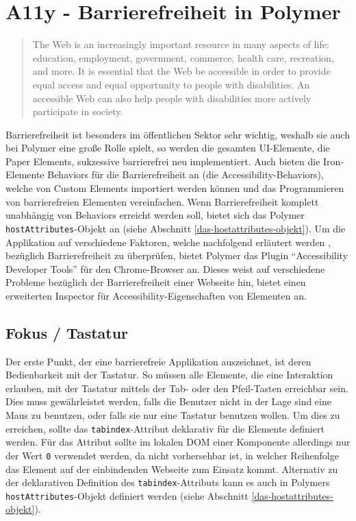 \section{A11y - Barrierefreiheit in Polymer}\label{a11y---barrierefreiheit-in-polymer}

\begin{quote}
The Web is an increasingly important resource in many aspects of life: education, employment, government, commerce, health care, recreation, and more. It is essential that the Web be accessible in order to provide equal access and equal opportunity to people with disabilities. An accessible Web can also help people with disabilities more actively participate in society. \cite{citeulike:13915280}
\end{quote}

Barrierefreiheit ist besonders im öffentlichen Sektor sehr wichtig, weshalb sie auch bei Polymer eine große Rolle spielt, so werden die gesamten \ac{UI}-Elemente, die Paper Elements, sukzessive barrierefrei neu implementiert. Auch bieten die Iron-Elemente Behaviors für die Barrierefreiheit an (die Accessibility-Behaviors), welche von Custom Elements importiert werden können und das Programmieren von barrierefreien Elementen vereinfachen. Wenn Barrierefreiheit komplett unabhängig von Behaviors erreicht werden soll, bietet sich das Polymer \texttt{hostAttributes}-Objekt an (siehe Abschnitt \ref{das-hostattributes-objekt}). Um die Applikation auf verschiedene Faktoren, welche nachfolgend erläutert werden \cite{citeulike:13915273}, bezüglich Barrierefreiheit zu überprüfen, bietet Polymer das Plugin ``Accessibility Developer Tools'' für den Chrome-Browser an. Dieses weist auf verschiedene Probleme bezüglich der Barrierefreiheit einer Webseite hin, bietet einen erweiterten Inspector für Accessibility-Eigenschaften von Elementen an.


\subsection{Fokus / Tastatur}\label{fokus-tastatur}

Der erste Punkt, der eine barrierefreie Applikation auszeichnet, ist deren Bedienbarkeit mit der Tastatur. So müssen alle Elemente, die eine Interaktion erlauben, mit der Tastatur mittels der Tab- oder den Pfeil-Tasten erreichbar sein. Dies muss gewährleistet werden, falls die Benutzer nicht in der Lage sind eine Maus zu benutzen, oder falls sie nur eine Tastatur benutzen wollen. Um dies zu erreichen, sollte das \texttt{tabindex}-Attribut deklarativ für die Elemente definiert werden. Für das Attribut sollte im lokalen \ac{DOM} einer Komponente allerdings nur der Wert \texttt{0} verwendet werden, da nicht vorhersehbar ist, in welcher Reihenfolge das Element auf der einbindenden Webseite zum Einsatz kommt. Alternativ zu der deklarativen Definition des \texttt{tabindex}-Attributs kann es auch in Polymers \texttt{hostAttributes}-Objekt definiert werden (siehe Abschnitt \ref{das-hostattributes-objekt}).

